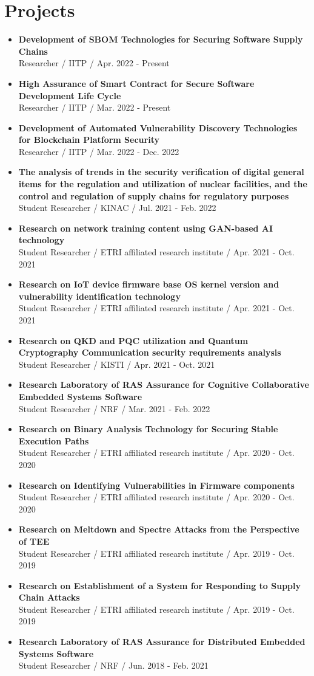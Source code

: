 \documentclass[letterpaper,11pt]{article}
\newcommand{\resumeItem}[1]{
  \item\small{
    {#1 \vspace{-2pt}}
  }
}
\newcommand{\resumeItemListStart}{\begin{itemize}}
\newcommand{\resumeItemListEnd}{\end{itemize}\vspace{-5pt}}
\begin{document}
\section{Projects}
    \vspace{3pt}
    \resumeItemListStart
      \resumeItem{\textbf{Development of SBOM Technologies for Securing Software Supply Chains
      } \\ Researcher / IITP / Apr. 2022 - Present}
      \resumeItem{\textbf{High Assurance of Smart Contract for Secure Software Development Life Cycle} \\ Researcher / IITP / Mar. 2022 - Present}
      \resumeItem{\textbf{Development of Automated Vulnerability Discovery Technologies for Blockchain Platform Security} \\ Researcher / IITP / Mar. 2022 - Dec. 2022}
      \resumeItem{\textbf{The analysis of trends in the security verification of digital general items for the regulation and utilization of nuclear facilities, and the control and regulation of supply chains for regulatory purposes} \\ Student Researcher / KINAC / Jul. 2021 - Feb. 2022}
      \resumeItem{\textbf{Research on network training content using GAN-based AI technology} \\ Student Researcher / ETRI affiliated research institute / Apr. 2021 - Oct. 2021}
      \resumeItem{\textbf{Research on IoT device firmware base OS kernel version and vulnerability identification technology} \\ Student Researcher / ETRI affiliated research institute / Apr. 2021 - Oct. 2021}
      \resumeItem{\textbf{Research on QKD and PQC utilization and Quantum Cryptography Communication security requirements analysis} \\ Student Researcher / KISTI / Apr. 2021 - Oct. 2021}
      \resumeItem{\textbf{Research Laboratory of RAS Assurance for Cognitive Collaborative Embedded Systems Software} \\ Student Researcher / NRF / Mar. 2021 - Feb. 2022}
      \resumeItem{\textbf{Research on Binary Analysis Technology for Securing Stable Execution Paths} \\ Student Researcher / ETRI affiliated research institute / Apr. 2020 - Oct. 2020}
      \resumeItem{\textbf{Research on Identifying Vulnerabilities in Firmware components} \\ Student Researcher / ETRI affiliated research institute / Apr. 2020 - Oct. 2020}
      \resumeItem{\textbf{Research on Meltdown and Spectre Attacks from the Perspective of TEE} \\ Student Researcher / ETRI affiliated research institute / Apr. 2019 - Oct. 2019}
      \resumeItem{\textbf{Research on Establishment of a System for Responding to Supply Chain Attacks} \\ Student Researcher / ETRI affiliated research institute / Apr. 2019 - Oct. 2019}
      \resumeItem{\textbf{Research Laboratory of RAS Assurance for Distributed Embedded Systems Software} \\ Student Researcher / NRF / Jun. 2018 - Feb. 2021}
    \resumeItemListEnd
\end{document}
